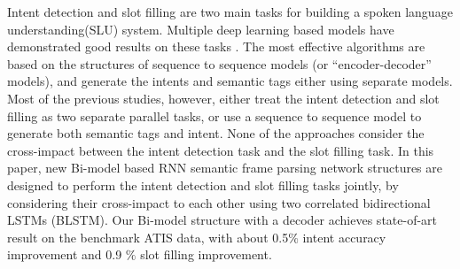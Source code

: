 Intent detection and slot filling are two main tasks for building a spoken language understanding(SLU) system. Multiple deep learning based models have demonstrated good results on these tasks . The most effective algorithms are based on the structures of sequence to sequence models (or ``encoder-decoder'' models), and generate the intents and semantic tags either using separate models. Most of the previous studies, however, either treat the intent detection and slot filling as two separate parallel tasks, or use a sequence to sequence model to generate both semantic tags and intent. None of the approaches consider the cross-impact between the intent detection task and the slot filling task. In this paper, new Bi-model based RNN semantic frame parsing network structures are designed to perform the intent detection and slot filling tasks jointly, by considering their cross-impact to each other using two correlated bidirectional LSTMs (BLSTM). Our Bi-model structure with a decoder achieves state-of-art result on the benchmark ATIS data, with about 0.5$\%$ intent accuracy improvement and 0.9 $\%$ slot filling improvement.
